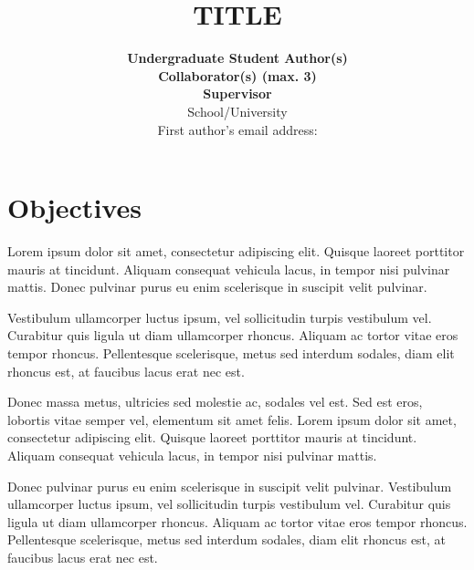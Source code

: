 \documentclass[a4paper,10pt,twocolumn]{article}
\newlength{\titlespace}
\begin{document}

\title{
    \vspace*{-0.8cm}
    {\fontsize{13}{13}\textbf{TITLE}}
    \vspace*{-0.1cm}
}
\author{
    \textbf{Undergraduate Student Author(s)}
    \vspace*{\titlespace}
    \\
    \textbf{Collaborator(s) (max. 3)}
    \vspace*{\titlespace}
    \\
    \textbf{Supervisor}
    \vspace*{\titlespace}
    \\
    School/University
    \vspace*{\titlespace}
    \\
    \normalsize{First author's email address:}
}
\date{}
\maketitle

\thispagestyle{fancy}

\section*{Objectives}

Lorem ipsum dolor sit amet, consectetur adipiscing elit. Quisque laoreet porttitor mauris at tincidunt. Aliquam consequat vehicula lacus, in tempor nisi pulvinar mattis. Donec pulvinar purus eu enim scelerisque in suscipit velit pulvinar.

Vestibulum ullamcorper luctus ipsum, vel sollicitudin turpis vestibulum vel. Curabitur quis ligula ut diam ullamcorper rhoncus. Aliquam ac tortor vitae eros tempor rhoncus. Pellentesque scelerisque, metus sed interdum sodales, diam elit rhoncus est, at faucibus lacus erat nec est.

Donec massa metus, ultricies sed molestie ac, sodales vel est. Sed est eros, lobortis vitae semper vel, elementum sit amet felis. Lorem ipsum dolor sit amet, consectetur adipiscing elit. Quisque laoreet porttitor mauris at tincidunt. Aliquam consequat vehicula lacus, in tempor nisi pulvinar mattis.

Donec pulvinar purus eu enim scelerisque in suscipit velit pulvinar. Vestibulum ullamcorper luctus ipsum, vel sollicitudin turpis vestibulum vel. Curabitur quis ligula ut diam ullamcorper rhoncus. Aliquam ac tortor vitae eros tempor rhoncus. Pellentesque scelerisque, metus sed interdum sodales, diam elit rhoncus est, at faucibus lacus erat nec est.
\end{document}
